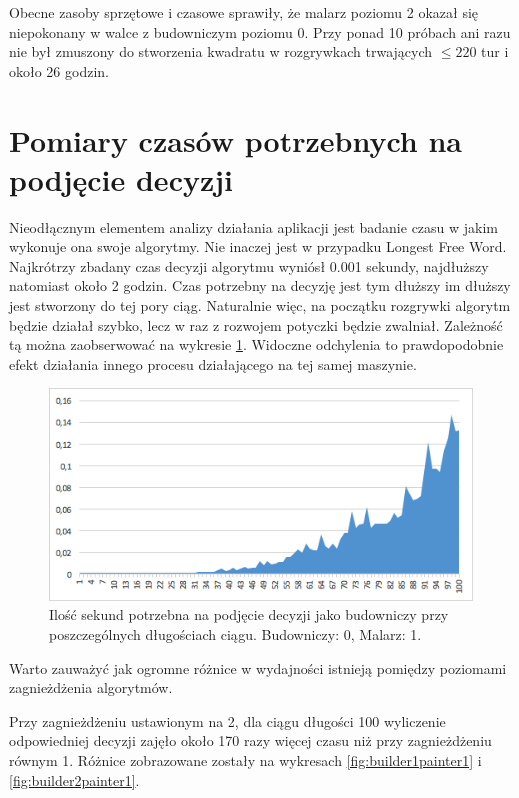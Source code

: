 \documentclass[document]{xmgr}
\begin{document}
Obecne zasoby sprzętowe i czasowe sprawiły, że malarz poziomu 2 okazał się niepokonany w walce z budowniczym poziomu 0. Przy ponad 10 próbach ani razu nie był zmuszony do stworzenia kwadratu w rozgrywkach trwających $\leq 220$ tur i około 26 godzin.





\section{Pomiary czasów potrzebnych na podjęcie decyzji}
Nieodłącznym elementem analizy działania aplikacji jest badanie czasu w jakim wykonuje ona swoje algorytmy. Nie inaczej jest w przypadku Longest Free Word. Najkrótrzy zbadany czas decyzji algorytmu wyniósł 0.001 sekundy, najdłuższy natomiast około 2 godzin. Czas potrzebny na decyzję jest tym dłuższy im dłuższy jest stworzony do tej pory ciąg. Naturalnie więc, na początku rozgrywki algorytm będzie działał szybko, lecz w raz z rozwojem potyczki będzie zwalniał. Zależność tą można zaobserwować na wykresie \ref{fig:builder0painter1}. Widoczne odchylenia to prawdopodobnie efekt działania innego procesu działającego na tej samej maszynie.

\begin{figure}[H]
    \centering
    \includegraphics[scale = 0.7]{images/timeBuilder0Painter1}
    \caption{Ilość sekund potrzebna na podjęcie decyzji jako budowniczy przy poszczególnych długościach ciągu. Budowniczy: 0, Malarz: 1.}
    \label{fig:builder0painter1}
\end{figure}

Warto zauważyć jak ogromne różnice w wydajności istnieją pomiędzy poziomami zagnieżdżenia algorytmów.

Przy zagnieżdżeniu ustawionym na 2, dla ciągu długości 100 wyliczenie odpowiedniej decyzji zajęło około 170 razy więcej czasu niż przy zagnieżdżeniu równym 1. Różnice zobrazowane zostały na wykresach \ref{fig:builder1painter1} i \ref{fig:builder2painter1}.
\end{document}
